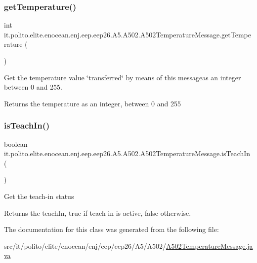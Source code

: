 \subsubsection{\texorpdfstring{get\+Temperature()}{getTemperature()}}
{\footnotesize\ttfamily int it.\+polito.\+elite.\+enocean.\+enj.\+eep.\+eep26.\+A5.\+A502.\+A502\+Temperature\+Message.\+get\+Temperature (\begin{DoxyParamCaption}{ }\end{DoxyParamCaption})}

Get the temperature value \char`\"{}transferred\char`\"{} by means of this messageas an integer between 0 and 255. \begin{DoxyReturn}{Returns}
the temperature as an integer, between 0 and 255 
\end{DoxyReturn}
\hypertarget{classit_1_1polito_1_1elite_1_1enocean_1_1enj_1_1eep_1_1eep26_1_1_a5_1_1_a502_1_1_a502_temperature_message_a5f81f72aeaf4cd6673f4ed3b52d21db6}{}\label{classit_1_1polito_1_1elite_1_1enocean_1_1enj_1_1eep_1_1eep26_1_1_a5_1_1_a502_1_1_a502_temperature_message_a5f81f72aeaf4cd6673f4ed3b52d21db6} 
\subsubsection{\texorpdfstring{is\+Teach\+In()}{isTeachIn()}}
{\footnotesize\ttfamily boolean it.\+polito.\+elite.\+enocean.\+enj.\+eep.\+eep26.\+A5.\+A502.\+A502\+Temperature\+Message.\+is\+Teach\+In (\begin{DoxyParamCaption}{ }\end{DoxyParamCaption})}

Get the teach-\/in status \begin{DoxyReturn}{Returns}
the teach\+In, true if teach-\/in is active, false otherwise. 
\end{DoxyReturn}


The documentation for this class was generated from the following file\+:\begin{DoxyCompactItemize}
\item 
src/it/polito/elite/enocean/enj/eep/eep26/\+A5/\+A502/\hyperlink{_a502_temperature_message_8java}{A502\+Temperature\+Message.\+java}\end{DoxyCompactItemize}
